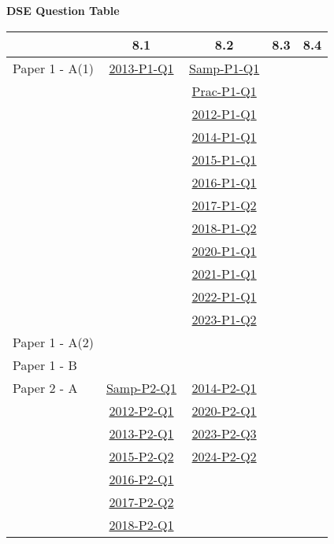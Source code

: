 \documentclass[12pt, a4paper]{article}
\begin{document}
\begin{absolutelynopagebreak}
\begin{center}
\textbf{DSE Question Table}
\end{center}
\begin{center}
\begin{tabular}{|l|c|c|c|c|}
\hline
        & 8.1 & 8.2 & 8.3 & 8.4 \\\hline
\hline
Paper 1 - A(1)& \hyperref[DSE2013-CoreP1-Q01]{2013-P1-Q1} & \hyperref[DSE2012S-CoreP1-Q01]{Samp-P1-Q1} &  &  \\
&  & \hyperref[DSE2012P-CoreP1-Q01]{Prac-P1-Q1} &  &  \\
&  & \hyperref[DSE2012-CoreP1-Q01]{2012-P1-Q1} &  &  \\
&  & \hyperref[DSE2014-CoreP1-Q01]{2014-P1-Q1} &  &  \\
&  & \hyperref[DSE2015-CoreP1-Q01]{2015-P1-Q1} &  &  \\
&  & \hyperref[DSE2016-CoreP1-Q01]{2016-P1-Q1} &  &  \\
&  & \hyperref[DSE2017-CoreP1-Q02]{2017-P1-Q2} &  &  \\
&  & \hyperref[DSE2018-CoreP1-Q02]{2018-P1-Q2} &  &  \\
&  & \hyperref[DSE2020-CoreP1-Q01]{2020-P1-Q1} &  &  \\
&  & \hyperref[DSE2021-CoreP1-Q01]{2021-P1-Q1} &  &  \\
&  & \hyperref[DSE2022-CoreP1-Q01]{2022-P1-Q1} &  &  \\
&  & \hyperref[DSE2023-CoreP1-Q02]{2023-P1-Q2} &  &  \\
\hline
Paper 1 - A(2)&  &  &  &  \\
\hline
Paper 1 - B&  &  &  &  \\
\hline
\hline
Paper 2 - A& \hyperref[DSE2012S-CoreP2-Q01]{Samp-P2-Q1} & \hyperref[DSE2014-CoreP2-Q01]{2014-P2-Q1} &  &  \\
& \hyperref[DSE2012-CoreP2-Q01]{2012-P2-Q1} & \hyperref[DSE2020-CoreP2-Q01]{2020-P2-Q1} &  &  \\
& \hyperref[DSE2013-CoreP2-Q01]{2013-P2-Q1} & \hyperref[DSE2023-CoreP2-Q03]{2023-P2-Q3} &  &  \\
& \hyperref[DSE2015-CoreP2-Q02]{2015-P2-Q2} & \hyperref[DSE2024-CoreP2-Q02]{2024-P2-Q2} &  &  \\
& \hyperref[DSE2016-CoreP2-Q01]{2016-P2-Q1} &  &  &  \\
& \hyperref[DSE2017-CoreP2-Q02]{2017-P2-Q2} &  &  &  \\
& \hyperref[DSE2018-CoreP2-Q01]{2018-P2-Q1} &  &  &  \\

\end{tabular}
\end{center}
\end{absolutelynopagebreak}
\end{document}
